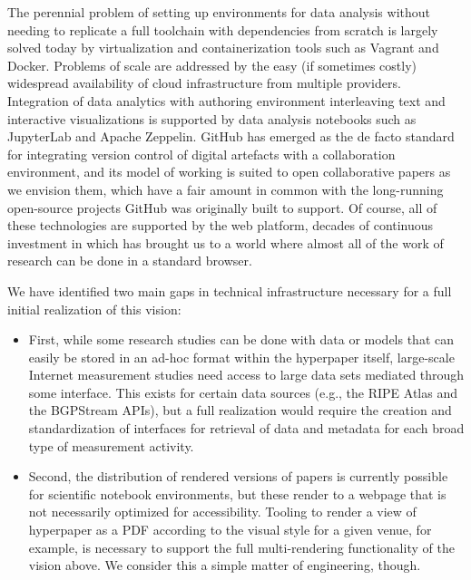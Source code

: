 \documentclass[sigconf]{acmart}
\begin{document}
The perennial problem of setting up environments for data analysis without
needing to replicate a full toolchain with dependencies from scratch is largely
solved today by virtualization and containerization tools such as Vagrant and
Docker. Problems of scale are addressed by the easy (if sometimes costly)
widespread availability of cloud infrastructure from multiple providers.
Integration of data analytics with authoring environment interleaving text and
interactive visualizations is supported by data analysis notebooks such as
JupyterLab and Apache Zeppelin. GitHub has emerged as the de facto standard for
integrating version control of digital artefacts with a collaboration
environment, and its model of working is suited to open collaborative papers as
we envision them, which have a fair amount in common with the long-running
open-source projects GitHub was originally built to support. Of course, all of
these technologies are supported by the web platform, decades of continuous
investment in which has brought us to a world where almost all of the work of
research can be done in a standard browser.

We have identified two main gaps in technical infrastructure necessary for a
full initial realization of this vision:

\begin{itemize}
	
	\item First, while some research studies can be done with data or models
that can easily be stored in an ad-hoc format within the hyperpaper itself,
large-scale Internet measurement studies need access to large data sets mediated
through some interface. This exists for certain data sources (e.g., the RIPE
Atlas and the BGPStream APIs), but a full realization would require the creation
and standardization of interfaces for retrieval of data and metadata for each
broad type of measurement activity.

	\item Second, the distribution of rendered versions of papers is currently
	possible for scientific notebook environments, but these render to a webpage
	that is not necessarily optimized for accessibility. Tooling to render a
	view of hyperpaper as a PDF according to the visual style for a given venue,
	for example, is necessary to support the full multi-rendering functionality
	of the vision above. We consider this a simple matter of engineering,
	though.

\end{itemize}
\end{document}
